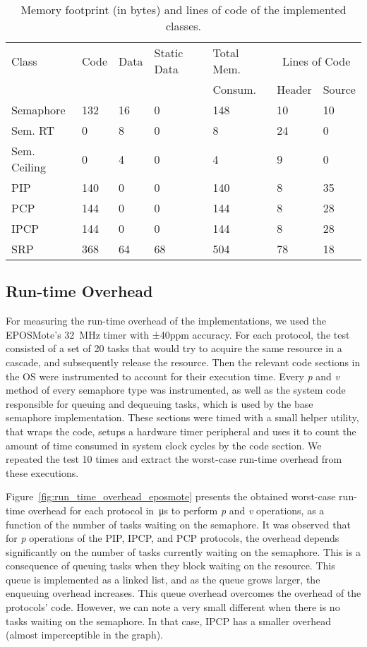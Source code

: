 \begin{table}[!ht]
\centering
\caption{Memory footprint (in bytes) and lines of code of the implemented 
classes.}
\begin{tabular}{l l l l l|l l}
Class	& Code &  Data & Static Data & Total Mem. & 
\multicolumn{2}{c}{Lines of Code} \\ 
			&	   &	   &			 &	Consum.	 & Header & Source \\
\hline
Semaphore 			& 132 & 16 & 0  & 148 & 10 & 10 \\ \hline
Sem. RT		 		& 0   & 8  & 0  & 8   & 24 & 0  \\ \hline
Sem. Ceiling	 	& 0   & 4  & 0  & 4   & 9  & 0  \\ \hline
PIP 				& 140   & 0  & 0  & 140   & 8  & 35 \\ \hline
PCP 				& 144  & 0  & 0  & 144  & 8  & 28 \\ \hline
IPCP 				& 144  & 0  & 0  & 144  & 8  & 28 \\ \hline
SRP 				& 368 & 64  & 68 & 504 & 78 & 18 \\ \hline
\end{tabular}
\label{tab:memory}
\end{table}

\subsection{Run-time Overhead}


For measuring the run-time overhead of the implementations, we used the  
EPOSMote’s 32~MHz timer with ±40ppm accuracy. For each protocol, the test 
consisted of a set of 20 tasks that would try to acquire the same resource in a 
cascade, and subsequently release the resource. Then the relevant code sections 
in the OS were instrumented to account for their execution time. Every 
\textit{p} and \textit{v} method of every semaphore type was instrumented, as 
well as the system code responsible for queuing and dequeuing tasks, which is 
used by the base semaphore implementation. These sections were timed 
with a small helper utility, that wraps the code, setups a hardware timer 
peripheral and uses it to count the amount of time consumed in system clock 
cycles by the code section. We repeated the test 10 times and extract the 
worst-case run-time overhead from these executions.

Figure~\ref{fig:run_time_overhead_eposmote} presents the obtained 
worst-case run-time overhead for each protocol in~\si{\micro\second} to perform 
\textit{p} and \textit{v} operations, as a function of the number of tasks 
waiting on the semaphore. It was observed that for \textit{p} operations of the 
PIP, IPCP, and PCP protocols, the overhead depends significantly on the number 
of tasks currently waiting on the semaphore. This is a consequence of queuing 
tasks when they block waiting on the resource. This queue is implemented as a 
linked list, and as the queue grows larger, the enqueuing overhead increases. 
This queue overhead overcomes the overhead of the protocols' code. However, we 
can note a very small different when there is no tasks waiting on the semaphore. 
In that case, IPCP has a smaller overhead (almost imperceptible in the graph).

